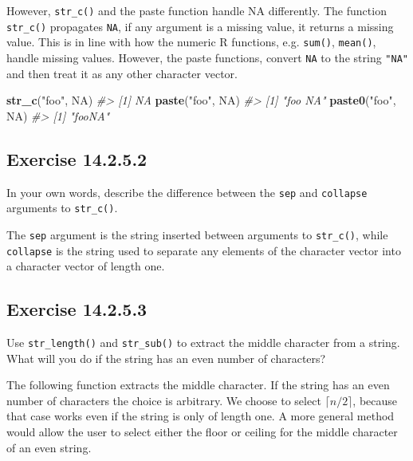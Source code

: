 \documentclass[]{book}
\newenvironment{Shaded}{\begin{snugshade}}{\end{snugshade}}
\newcommand{\CommentTok}[1]{\textcolor[rgb]{0.56,0.35,0.01}{\textit{#1}}}
\newcommand{\KeywordTok}[1]{\textcolor[rgb]{0.13,0.29,0.53}{\textbf{#1}}}
\newcommand{\NormalTok}[1]{#1}
\newcommand{\OtherTok}[1]{\textcolor[rgb]{0.56,0.35,0.01}{#1}}
\newcommand{\StringTok}[1]{\textcolor[rgb]{0.31,0.60,0.02}{#1}}
\theoremstyle{plain}
\theoremstyle{remark}
\begin{document}
However, \texttt{str\_c()} and the paste function handle NA differently.
The function \texttt{str\_c()} propagates \texttt{NA}, if any argument
is a missing value, it returns a missing value. This is in line with how
the numeric R functions, e.g. \texttt{sum()}, \texttt{mean()}, handle
missing values. However, the paste functions, convert \texttt{NA} to the
string \texttt{"NA"} and then treat it as any other character vector.

\begin{Shaded}
\begin{Highlighting}[]
\KeywordTok{str_c}\NormalTok{(}\StringTok{"foo"}\NormalTok{, }\OtherTok{NA}\NormalTok{)}
\CommentTok{#> [1] NA}
\KeywordTok{paste}\NormalTok{(}\StringTok{"foo"}\NormalTok{, }\OtherTok{NA}\NormalTok{)}
\CommentTok{#> [1] "foo NA"}
\KeywordTok{paste0}\NormalTok{(}\StringTok{"foo"}\NormalTok{, }\OtherTok{NA}\NormalTok{)}
\CommentTok{#> [1] "fooNA"}
\end{Highlighting}
\end{Shaded}

\hypertarget{exercise-14.2.5.2}{%
\subsection*{\texorpdfstring{Exercise
{14.2.5.2}}{Exercise 14.2.5.2}}\label{exercise-14.2.5.2}}

In your own words, describe the difference between the \texttt{sep} and
\texttt{collapse} arguments to \texttt{str\_c()}.

The \texttt{sep} argument is the string inserted between arguments to
\texttt{str\_c()}, while \texttt{collapse} is the string used to
separate any elements of the character vector into a character vector of
length one.

\hypertarget{exercise-14.2.5.3}{%
\subsection*{\texorpdfstring{Exercise
{14.2.5.3}}{Exercise 14.2.5.3}}\label{exercise-14.2.5.3}}

Use \texttt{str\_length()} and \texttt{str\_sub()} to extract the middle
character from a string. What will you do if the string has an even
number of characters?

The following function extracts the middle character. If the string has
an even number of characters the choice is arbitrary. We choose to
select \(\lceil n / 2 \rceil\), because that case works even if the
string is only of length one. A more general method would allow the user
to select either the floor or ceiling for the middle character of an
even string.
\end{document}
